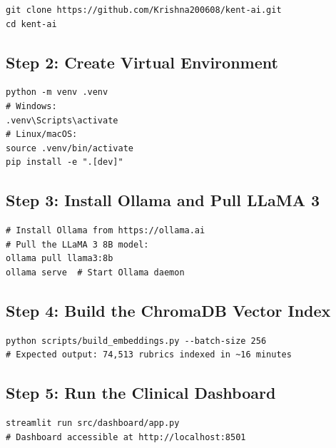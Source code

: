 \begin{lstlisting}[style=python, caption={Repository Clone}]
git clone https://github.com/Krishna200608/kent-ai.git
cd kent-ai
\end{lstlisting}

\subsection{Step 2: Create Virtual Environment}

\begin{lstlisting}[style=python, caption={Virtual Environment Setup}]
python -m venv .venv
# Windows:
.venv\Scripts\activate
# Linux/macOS:
source .venv/bin/activate
pip install -e ".[dev]"
\end{lstlisting}

\subsection{Step 3: Install Ollama and Pull LLaMA 3}

\begin{lstlisting}[style=python, caption={Ollama Setup}]
# Install Ollama from https://ollama.ai
# Pull the LLaMA 3 8B model:
ollama pull llama3:8b
ollama serve  # Start Ollama daemon
\end{lstlisting}

\subsection{Step 4: Build the ChromaDB Vector Index}

\begin{lstlisting}[style=python, caption={Vector Index Build}]
python scripts/build_embeddings.py --batch-size 256
# Expected output: 74,513 rubrics indexed in ~16 minutes
\end{lstlisting}

\subsection{Step 5: Run the Clinical Dashboard}

\begin{lstlisting}[style=python, caption={Streamlit Dashboard Launch}]
streamlit run src/dashboard/app.py
# Dashboard accessible at http://localhost:8501
\end{lstlisting}


